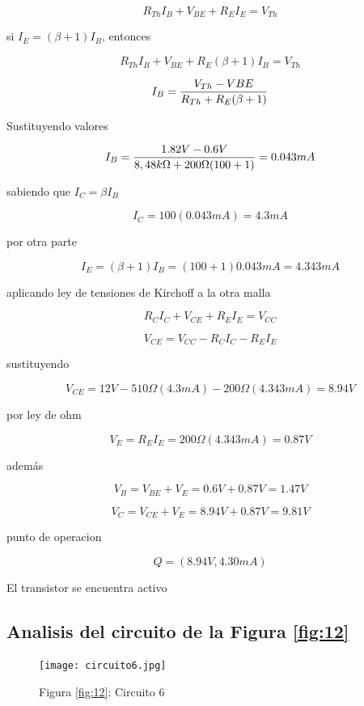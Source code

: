 \documentclass[10pt, a4paper]{article}
\begin{document}
    $$R_{Th}I_B + V_{BE} + R_EI_E = V_{Th}$$

    si $I_E = (\beta + 1)I_B$, entonces

    $$R_{Th}I_B + V_{BE} + R_E(\beta + 1)I_B = V_{Th}$$

    $$I_B = {V_{Th} - V{BE} \over R_{Th} + R_E(\beta + 1)}$$

    Sustituyendo valores

    $$I_B = {1.82V - 0.6V \over 8,48k\Omega + 200\Omega(100 + 1)} = 0.043mA$$

    sabiendo que $I_C = \beta I_B$

    $$I_C = 100(0.043mA) = 4.3mA$$

    por otra parte

    $$I_E = (\beta + 1)I_B = (100 + 1)0.043mA = 4.343mA$$

    aplicando ley de tensiones de Kirchoff a la otra malla

    $$R_{C}I_C + V_{CE} + R_EI_E = V_{CC}$$

    $$V_{CE} = V_{CC} - R_{C}I_C - R_EI_E$$

    sustituyendo

    $$V_{CE} = 12V - 510\Omega (4.3mA) - 200\Omega (4.343mA) = 8.94V$$

    por ley de ohm

    $$V_E = R_EI_E = 200\Omega (4.343mA) = 0.87V$$

    además

    $$V_B = V_{BE} + V_E = 0.6V + 0.87V = 1.47V$$

    $$V_C = V_{CE} + V_E = 8.94V + 0.87V = 9.81V$$

    punto de operacion

    \setcounter{equation}{1}
    \begin{equation}
        Q = (8.94V, 4.30mA)
        \label{Q5}
    \end{equation}

    El transistor se encuentra activo

    \subsection{Analisis del circuito de la Figura \ref{fig:12}}

    \begin{figure}[h!]
        \centering
        \texttt{[image: circuito6.jpg]} \par
        Figura \ref{fig:12}: Circuito 6 %
    \end{figure}
\end{document}
